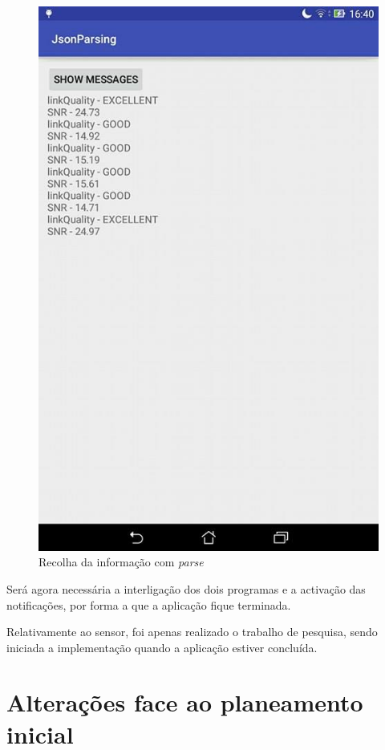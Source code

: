 \documentclass[a4paper]{article}
\begin{document}
\begin{figure}[H]
  \includegraphics[width=\linewidth]{json.jpg}
  \caption{Recolha da informação com \textit{parse}}\label{fig:json}
\endminipage\hfill
\end{figure}

Será agora necessária a interligação dos dois programas e a activação das notificações, por forma a que a aplicação fique terminada.

Relativamente ao sensor, foi apenas realizado o trabalho de pesquisa, sendo iniciada a implementação quando a aplicação estiver concluída.

\section{Alterações face ao planeamento inicial}
\end{document}
